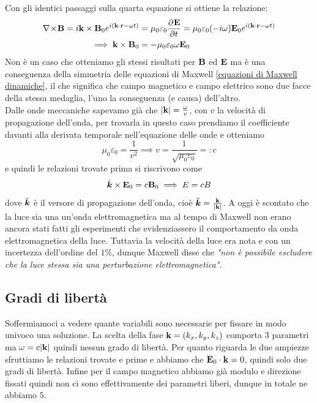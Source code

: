 Con gli identici passaggi sulla quarta equazione si ottiene la relazione:
\begin{align}
  \nabla\!\times\!\mathbf{ B } = i \mathbf{ k\times B }_0 e^{i\left( \mathbf{ k \cdot r } - \omega t \right)} 
  &= \mu_0 \varepsilon_0 \frac{\partial^{} {\mathbf{ E }}}{\partial {t}^{}}   = \mu_0 \varepsilon_0 (- i \omega ) \mathbf{ E }_0 e^{i\left( \mathbf{ k \cdot r } - \omega t \right)}
  \\
  \implies \mathbf{ k\times B }_0 &= - \mu_0 \varepsilon_0 \omega \mathbf{ E }_0
\end{align}
Non è un caso che otteniamo gli stessi risultati per $ \mathbf{ B } $ ed $ \mathbf{ E } $ ma è una conseguenza della simmetria delle equazioni di 
Maxwell \eqref{equazioni di Maxwell dinamiche}, il che significa che campo magnetico e campo elettrico sono due facce della stessa medaglia, l'uno 
la conseguenza (e causa) dell'altro.\\
Dalle onde meccaniche sapevamo già che $ |\mathbf{ k }| = \frac{\omega}{v} $, con $ v $ la velocità di propagazione dell'onda, per trovarla in questo 
caso prendiamo il coefficiente davanti alla derivata temporale nell'equazione delle onde e otteniamo
\begin{equation} \label{definizione di c}
  \mu_0 \varepsilon_0 = \frac{1}{v^2} \implies v = \frac{1}{\sqrt{\mu_0 \varepsilon_0}} =: c
\end{equation}
e quindi le relazioni trovate prima si riscrivono come
\begin{align}
  \hat{\boldsymbol{k}} \times \mathbf{ E }_0 = c \mathbf{ B }_0 \implies E = c B
\end{align}
dove $ \hat{\boldsymbol{k}} $ è il versore di propagazione dell'onda, cioè $ \hat{\boldsymbol{k}} = \frac{\mathbf{ k }}{|\mathbf{ k }|} $. A oggi è scontato che la luce sia una un'onda 
elettromagnetica ma al tempo di Maxwell non erano ancora stati fatti gli esperimenti che evidenziassero il comportamento da onda elettromagnetica della 
luce. Tuttavia la velocità della luce era nota e con un incertezza dell'ordine del $ 1\% $, dunque Maxwell disse che 
\textit{"non è possibile escludere che la luce stessa sia una perturbazione elettromagnetica"}.

\subsection{Gradi di libertà}
Soffermiamoci a vedere quante variabili sono necessarie per fissare in modo univoco una soluzione. La scelta della fase 
$ \mathbf{ k } = (k_x,k_y,k_z) $ comporta 3 parametri ma $ \omega = c|\mathbf{ k }| $ quindi nessun grado di libertà. Per quanto riguarda le due 
ampiezze sfruttiamo le relazioni trovate e prime e abbiamo che $ \mathbf{ E }_0 \cdot \mathbf{ k } = 0 $, quindi solo due 
gradi di libertà. Infine per il campo magnetico abbiamo già modulo e direzione fissati quindi non ci sono effettivamente dei parametri liberi, 
dunque in totale ne abbiamo $ 5 $.


